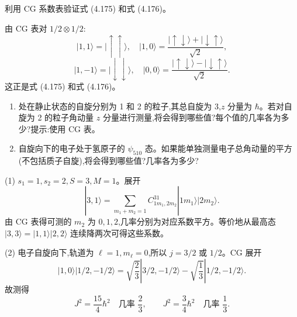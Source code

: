 \begin{question}
利用 CG 系数表验证式 (4.175) 和式 (4.176)。

\par\smallskip
{}

\end{question}
\begin{solution}

由 CG 表对 $1/2\otimes1/2$:
\[
|1,1\rangle=|\uparrow\uparrow\rangle,
\quad
|1,0\rangle=\frac{|\uparrow\downarrow\rangle+|\downarrow\uparrow\rangle}{\sqrt2},
\]
\[
|1,-1\rangle=|\downarrow\downarrow\rangle,
\quad
|0,0\rangle=\frac{|\uparrow\downarrow\rangle-|\downarrow\uparrow\rangle}{\sqrt2}.
\]
这正是式 (4.175) 和式 (4.176)。

\end{solution}

\begin{question}
\begin{enumerate}
\item 处在静止状态的自旋分别为 1 和 2 的粒子,其总自旋为 3,$z$ 分量为 $\hbar$。若对自旋为 2 的粒子角动量 $z$ 分量进行测量,将会得到哪些值?每个值的几率各为多少?提示:使用 CG 表。
\item 自旋向下的电子处于氢原子的 $\psi_{510}$ 态。如果能单独测量电子总角动量的平方(不包括质子自旋),将会得到哪些值?几率各为多少?
\end{enumerate}
\end{question}
\begin{solution}

(1) $s_1=1,s_2=2,S=3,M=1$。展开
\[
|3,1\rangle=\sum_{m_1+m_2=1}C_{1m_1,2m_2}^{31}|1m_1\rangle|2m_2\rangle.
\]
由 CG 表得可测的 $m_2$ 为 $0,1,2$,几率分别为对应系数平方。等价地从最高态 $|3,3\rangle=|1,1\rangle|2,2\rangle$ 连续降两次可得这些系数。

(2) 电子自旋向下,轨道为 $\ell=1,m_\ell=0$,所以 $j=3/2$ 或 $1/2$。CG 展开
\[
|1,0\rangle|1/2,-1/2\rangle
=\sqrt{\frac23}|3/2,-1/2\rangle-\sqrt{\frac13}|1/2,-1/2\rangle.
\]
故测得
\[
J^2=\frac{15}{4}\hbar^2\quad \text{几率 }\frac23,
\qquad
J^2=\frac34\hbar^2\quad \text{几率 }\frac13.
\]

\end{solution}

